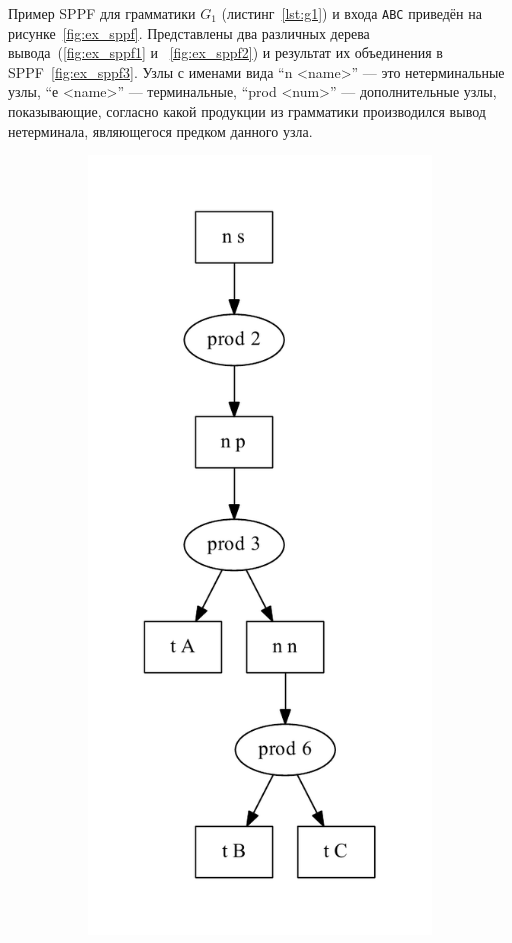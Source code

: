 Пример SPPF для грамматики $G_1$ (листинг~\ref{lst:g1}) и входа \verb|ABC| приведён на рисунке~\ref{fig:ex_sppf}. Представлены два различных дерева вывода~(\ref{fig:ex_sppf1} и ~\ref{fig:ex_sppf2}) и результат их объединения в SPPF~\ref{fig:ex_sppf3}. Узлы с именами вида ``n <name>'' --- это нетерминальные узлы, ``е <name>'' --- терминальные, ``prod <num>'' --- дополнительные узлы, показывающие, согласно какой продукции из грамматики производился вывод нетерминала, являющегося предком данного узла.  

\begin{figure}[h!]
\centering
   \begin{subfigure}[b]{0.3\textwidth}
       \includegraphics[width=\textwidth]{pics/ex_sppf1}

\end{subfigure}
\end{figure}
